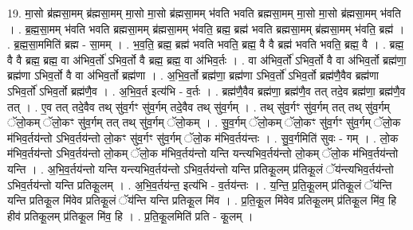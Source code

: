 \documentclass[17pt]{extarticle}
\begin{document}
19. मा॒सो ब्र॑ह्मसा॒मम् ब्र॑ह्मसा॒मम् मा॒सो मा॒सो ब्र॑ह्मसा॒मम् भ॑वति भवति ब्रह्मसा॒मम् मा॒सो मा॒सो ब्र॑ह्मसा॒मम् भ॑वति । . ब्र॒ह्म॒सा॒मम् भ॑वति भवति ब्रह्मसा॒मम् ब्र॑ह्मसा॒मम् भ॑वति॒ ब्रह्म॒ ब्रह्म॑ भवति ब्रह्मसा॒मम् ब्र॑ह्मसा॒मम् भ॑वति॒ ब्रह्म॑ । . ब्र॒ह्म॒सा॒ममिति॑ ब्रह्म - सा॒मम् । . भ॒व॒ति॒ ब्रह्म॒ ब्रह्म॑ भवति भवति॒ ब्रह्म॒ वै वै ब्रह्म॑ भवति भवति॒ ब्रह्म॒ वै । . ब्रह्म॒ वै वै ब्रह्म॒ ब्रह्म॒ वा अ॑भिव॒र्तो॑ ऽभिव॒र्तो वै ब्रह्म॒ ब्रह्म॒ वा अ॑भिव॒र्तः । . वा अ॑भिव॒र्तो॑ ऽभिव॒र्तो वै वा अ॑भिव॒र्तो ब्रह्म॑णा॒ ब्रह्म॑णा ऽभिव॒र्तो वै वा अ॑भिव॒र्तो ब्रह्म॑णा । . अ॒भि॒व॒र्तो ब्रह्म॑णा॒ ब्रह्म॑णा ऽभिव॒र्तो॑ ऽभिव॒र्तो ब्रह्म॑णै॒वैव ब्रह्म॑णा ऽभिव॒र्तो॑ ऽभिव॒र्तो 
ब्रह्म॑णै॒व । . अ॒भि॒व॒र्त इत्य॑भि - व॒र्तः । . ब्रह्म॑णै॒वैव ब्रह्म॑णा॒ ब्रह्म॑णै॒व तत् तदे॒व ब्रह्म॑णा॒ ब्रह्म॑णै॒व तत् । . ए॒व तत् तदे॒वैव तथ् सु॑व॒र्गꣳ सु॑व॒र्गम् तदे॒वैव तथ् सु॑व॒र्गम् । . तथ् सु॑व॒र्गꣳ सु॑व॒र्गम् तत् तथ् सु॑व॒र्गम् ॅलो॒कम् ॅलो॒कꣳ सु॑व॒र्गम् तत् तथ् सु॑व॒र्गम् ॅलो॒कम् । . सु॒व॒र्गम् ॅलो॒कम् ॅलो॒कꣳ सु॑व॒र्गꣳ सु॑व॒र्गम् ॅलो॒क म॑भिव॒र्तय॑न्तो ऽभिव॒र्तय॑न्तो लो॒कꣳ सु॑व॒र्गꣳ सु॑व॒र्गम् ॅलो॒क म॑भिव॒र्तय॑न्तः । . सु॒व॒र्गमिति॑ सुवः - गम् । . लो॒क म॑भिव॒र्तय॑न्तो ऽभिव॒र्तय॑न्तो लो॒कम् ॅलो॒क म॑भिव॒र्तय॑न्तो यन्ति यन्त्यभिव॒र्तय॑न्तो लो॒कम् ॅलो॒क म॑भिव॒र्तय॑न्तो यन्ति । . अ॒भि॒व॒र्तय॑न्तो यन्ति यन्त्यभिव॒र्तय॑न्तो ऽभिव॒र्तय॑न्तो यन्ति प्रतिकू॒लम् प्र॑तिकू॒लं ॅय॑न्त्यभिव॒र्तय॑न्तो ऽभिव॒र्तय॑न्तो यन्ति प्रतिकू॒लम् । . अ॒भि॒व॒र्तय॑न्त॒ इत्य॑भि - व॒र्तय॑न्तः । . य॒न्ति॒ प्र॒ति॒कू॒लम् प्र॑तिकू॒लं ॅय॑न्ति यन्ति प्रतिकू॒ल मि॑वेव प्रतिकू॒लं ॅय॑न्ति यन्ति प्रतिकू॒ल मि॑व । . प्र॒ति॒कू॒ल मि॑वेव प्रतिकू॒लम् प्र॑तिकू॒ल मि॑व॒ हि हीव॑ प्रतिकू॒लम् प्र॑तिकू॒ल मि॑व॒ हि । . प्र॒ति॒कू॒लमिति॑ प्रति - कू॒लम् । \newline
\end{document}
